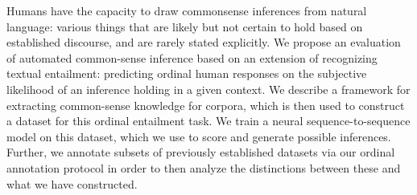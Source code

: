 Humans have the capacity to draw commonsense inferences from natural language{:} various things that are likely but not certain to hold based on established discourse, and are rarely stated explicitly. We propose an evaluation of automated common-sense inference based on an extension of recognizing textual entailment{:} predicting ordinal human responses on the subjective likelihood of an inference holding in a given context. We describe a framework for extracting common-sense knowledge for corpora, which is then used to construct a dataset for this ordinal entailment task. We train a neural sequence-to-sequence model on this dataset, which we use to score and generate possible inferences. Further, we annotate subsets of previously established datasets via our ordinal annotation protocol in order to then analyze the distinctions between these and what we have constructed.